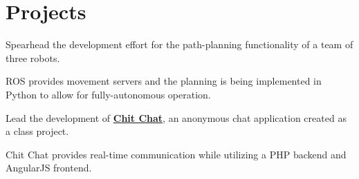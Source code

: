 \documentclass[]{deedy-resume-reversed}
\begin{document}
\begin{minipage}[t]{0.60\textwidth}
\section{Projects}
\begin{tightemize}
\item Spearhead the development effort for the path-planning functionality of a team of three robots.
\item ROS provides movement servers and the planning is being implemented in Python to allow for fully-autonomous operation.
\end{tightemize}
\sectionsep
{}
\begin{tightemize}
\item Lead the development of \textbf{\href{https://github.com/user/repo}{Chit Chat}}, an anonymous chat application created as a class project.
\item Chit Chat provides real-time communication while utilizing a PHP backend and AngularJS frontend.
\end{tightemize}
\sectionsep
\end{minipage}
\hfill
\end{document}

